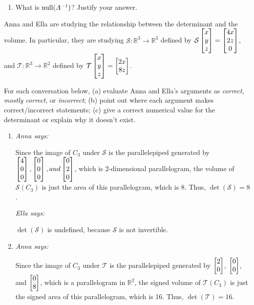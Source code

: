 \begin{exercises}
\begin{problist}
\begin{enumerate}
			\item What is $\operatorname{null}(A^{-1})$? Justify your answer.
		\end{enumerate}
		\prob Anna and Ella are studying the relationship between the determinant
		and the volume. In particular, they are studying $\mathcal{S}:\mathbb{R}^{3}
		\rightarrow\mathbb{R}^{3}$ defined by $\mathcal{S}\begin{bmatrix}x \\ y \\ z\end{bmatrix}=\begin{bmatrix}4x \\ 2z \\ 0\end{bmatrix}$, and
		$\mathcal{T}:\mathbb{R}^{3}\rightarrow\mathbb{R}^{2}$ defined by
		$\mathcal{T}\begin{bmatrix}x \\ y \\ z\end{bmatrix}=\begin{bmatrix}2x \\ 8z\end{bmatrix}$.

		For each conversation below, (a) evaluate Anna and Ella's arguments as \emph{correct},
		\emph{mostly correct}, or \emph{incorrect}; (b) point out where each argument
		makes correct/incorrect statements; (c) give a correct numerical value
		for the determinant or explain why it doesn't exist.
		\begin{enumerate}
			\item \emph{Anna says:}

				Since the image of $C_{3}$ under $\mathcal{S}$ is the
				parallelepiped generated by
				$\begin{bmatrix}4 \\ 0 \\ 0\end{bmatrix},\begin{bmatrix}0 \\ 0 \\ 0\end{bmatrix}, and \begin{bmatrix}0 \\ 2 \\ 0\end{bmatrix}$,
				which is 2-dimensional parallelogram, the volume of
				$\mathcal{S}(C_{3})$ is just the area of this parallelogram, which
				is 8. Thus, $\det(\mathcal{S})=8$.

				\emph{Ella says:}

				$\det(\mathcal{S})$ is undefined, because $\mathcal{S}$ is not
				invertible.

			\item \emph{Anna says:}

				Since the image of $C_{3}$ under $\mathcal{T}$ is the
				parallelepiped generated by $\begin{bmatrix}2 \\ 0\end{bmatrix}$, $\begin{bmatrix}0 \\ 0\end{bmatrix}$,
				and $\begin{bmatrix}0 \\ 8\end{bmatrix}$, which is a parallelogram in $\mathbb{R}^{2}$,
				the signed volume of $\mathcal{T}(C_{3})$ is just the signed
				area of this parallelogram, which is 16. Thus,
				$\det(\mathcal{T})=16$.


\end{enumerate}
\end{problist}
\end{exercises}
